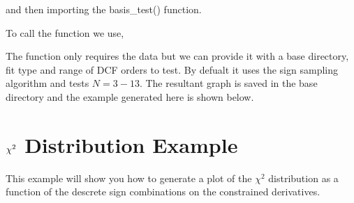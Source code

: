 \documentclass[letterpaper,10pt,english]{sphinxmanual}
\let\sphinxpxdimen\pdfpxdimen\else\newdimen\sphinxpxdimen
\begin{document}
\begin{sphinxVerbatim}[commandchars=\\\{\}]
   

  
  
\end{sphinxVerbatim}

and then importing the basis\_test() function.

\begin{sphinxVerbatim}[commandchars=\\\{\}]
   
\end{sphinxVerbatim}

To call the function we use,

\begin{sphinxVerbatim}[commandchars=\\\{\}]
  
\end{sphinxVerbatim}

The function only requires the data but we can provide it with a base directory,
fit type and range of DCF orders to test. By defualt it uses the sign sampling
algorithm and tests \({N = 3 - 13}\). The resultant graph is saved in the
base directory and the example generated here is shown below.

\noindent{\hspace*{\fill}\sphinxincludegraphics[width=400\sphinxpxdimen]{{Basis_functions}.png}\hspace*{\fill}}


\section{\protect\({\chi^2}\protect\) Distribution Example}
\label{\detokenize{source/maxsmooth:chi-2-distribution-example}}
This example will show you how to generate a plot of the \({\chi^2}\)
distribution as a function of the descrete sign combinations on the constrained
derivatives.
\end{document}
